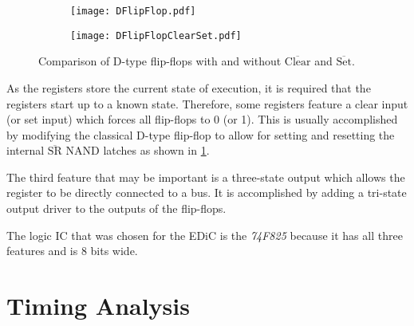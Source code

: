 \begin{figure}[t]
  \centering
  \begin{subfigure}[b]{.45\textwidth}
    \texttt{[image: DFlipFlop.pdf]}
  \end{subfigure}%
  \hspace{.05\textwidth}
  \begin{subfigure}[b]{.45\textwidth}
    \texttt{[image: DFlipFlopClearSet.pdf]}
  \end{subfigure}
  \caption{Comparison of D-type flip-flops with and without $\overline{\text{Clear}}$ and $\overline{\text{Set}}$.}
  \label{fig:clearSet}
\end{figure}
As the registers store the current state of execution, it is required that the registers start up to a known state.
Therefore, some registers feature a clear input (or set input) which forces all flip-flops to 0 (or 1).
This is usually accomplished by modifying the classical D-type flip-flop to allow for setting and resetting the internal $\overline{\text{SR}}$ NAND latches as shown in \cref{fig:clearSet}.

The third feature that may be important is a three-state output which allows the register to be directly connected to a bus.
It is accomplished by adding a tri-state output driver to the outputs of the flip-flops.

The logic \gls{IC} that was chosen for the \gls{EDiC} is the \emph{74F825} because it has all three features and is 8 bits wide.

\section{Timing Analysis}\label{sec:timing}